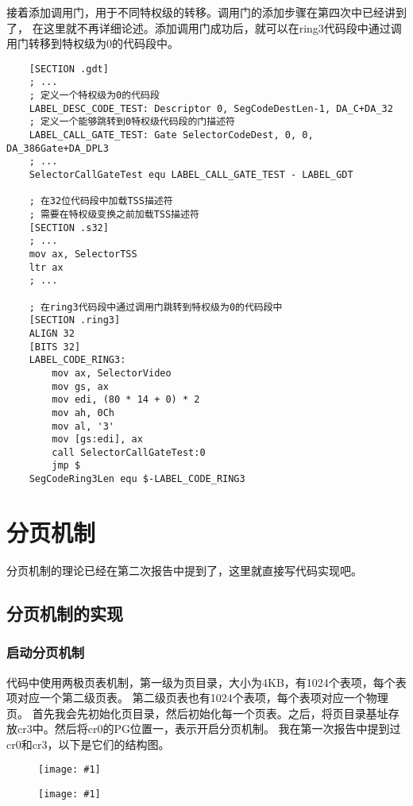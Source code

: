 \documentclass[a4paper,left=2.5cm,right=2.5cm,11pt]{article}
\newcommand{\fic}[1]{\begin{figure}[H]
		\center
		\texttt{[image: \#1]}
	\end{figure}}
\begin{document}
	接着添加调用门，用于不同特权级的转移。调用门的添加步骤在第四次中已经讲到了，
	在这里就不再详细论述。添加调用门成功后，就可以在ring3代码段中通过调用门转移到特权级为0的代码段中。
	\begin{lstlisting}
	[SECTION .gdt]
	; ...
	; 定义一个特权级为0的代码段
	LABEL_DESC_CODE_TEST: Descriptor 0, SegCodeDestLen-1, DA_C+DA_32
	; 定义一个能够跳转到0特权级代码段的门描述符
	LABEL_CALL_GATE_TEST: Gate SelectorCodeDest, 0, 0, DA_386Gate+DA_DPL3
	; ...
	SelectorCallGateTest equ LABEL_CALL_GATE_TEST - LABEL_GDT

	; 在32位代码段中加载TSS描述符
	; 需要在特权级变换之前加载TSS描述符
	[SECTION .s32]
	; ...
	mov ax, SelectorTSS
	ltr ax
	; ...

	; 在ring3代码段中通过调用门跳转到特权级为0的代码段中
	[SECTION .ring3]
	ALIGN 32
	[BITS 32]
	LABEL_CODE_RING3:
		mov ax, SelectorVideo
		mov gs, ax
		mov edi, (80 * 14 + 0) * 2
		mov ah, 0Ch
		mov al, '3'
		mov [gs:edi], ax
		call SelectorCallGateTest:0
		jmp $
	SegCodeRing3Len equ $-LABEL_CODE_RING3
	\end{lstlisting}

\section{分页机制}
	分页机制的理论已经在第二次报告中提到了，这里就直接写代码实现吧。
\subsection{分页机制的实现}
\subsubsection{启动分页机制}
	代码中使用两极页表机制，第一级为页目录，大小为4KB，有1024个表项，每个表项对应一个第二级页表。
	第二级页表也有1024个表项，每个表项对应一个物理页。
	首先我会先初始化页目录，然后初始化每一个页表。之后，将页目录基址存放cr3中。然后将cr0的PG位置一，表示开启分页机制。
	我在第一次报告中提到过cr0和cr3，以下是它们的结构图。
	\fic{4.png}
	\fic{5.png}
\end{document}
